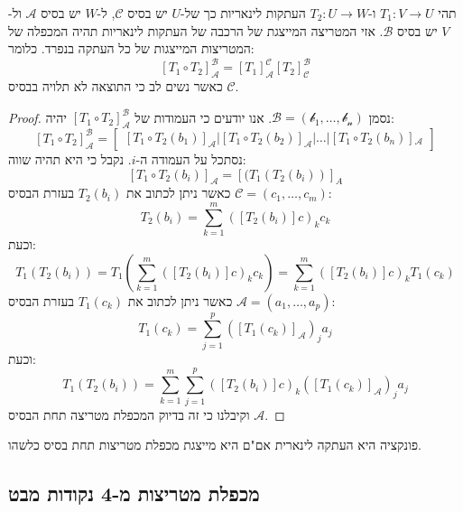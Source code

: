 \documentclass{tstextbook}
\begin{document}
\begin{proposition}
תהי \(T_{1}:V\to U\) ו-\(T_{2}:U\to W\) העתקות לינאריות כך של-\(U\) יש בסיס \(\mathcal{C}\), ל-\(W\) יש בסיס \(\mathcal{A}\) ול-\(V\) יש בסיס \(\mathcal{B}\). אזי המטריצה המייצגת של הרכבה של העתקות לינאריות תהיה המכפלה של המטריצות המייצגות של כל העתקה בנפרד. כלומר:
$$\left[ T_{1}\circ  T_{2} \right]_{\mathcal{A} }^{\mathcal{B} }=[T_{1}]_{\mathcal{A} }^{\mathcal{C} }[T_{2}]_{\mathcal{C} }^{\mathcal{B} }$$
כאשר נשים לב כי התוצאה לא תלויה בבסיס \(\mathcal{C}\).

\end{proposition}
\begin{proof}
נסמן \(\mathcal{B=\left( b_{1},\dots,b_{n} \right)}\).
אנו יודעים כי העמודות של \(\left[ T_{1}\circ T_{2} \right]_{\mathcal{A}}^{\mathcal{B}}\) יהיה:
$$\left[ T_{1}\circ T_{2} \right]_{\mathcal{A} }^{\mathcal{B} }=\begin{bmatrix}\left[ T_{1}\circ  T_{2}(b_{1}) \right]_{\mathcal{A} }\bigg| \left[ T_{1}\circ  T_{2}\left( b_{2} \right) \right]_{\mathcal{A} }\bigg|\dots \bigg| \left[ T_{1}\circ T_{2} (b_{n}) \right]\mathcal{_{A}}  
\end{bmatrix} $$
נסתכל על העמודה ה-\(i\). נקבל כי היא תהיה שווה:
$$\left[ T_{1}\circ T_{2}(b_{i}) \right]_{\mathcal{A} }=[(T_{1}(T_{2}(b_{i}))]_{A}$$
כאשר ניתן לכתוב את \(T_{2}(b_{i})\) בעזרת הבסיס \(\mathcal{C}=\left( c_{1},\dots,c_{m} \right)\):
$$T_{2}(b_{i})=\sum_{k=1}^{m}\left([T_{2}(b_{i})]c\right)_{k}c_{k}$$
וכעת:
$$T_{1}(T_{2}(b_{i}))=T_{1}\left(\sum_{k=1}^{m}\left([T_{2}(b_{i})]c\right)_{k}c_{k}\right)=\sum_{k=1}^{m}\left([T_{2}(b_{i})]c\right)_{k}T_{1}(c_{k})$$
כאשר ניתן לכתוב את \(T_{1}(c_{k})\) בעזרת הבסיס \(\mathcal{A}=\left( a_{1},\dots,a_{p} \right)\):
$$T_{1}(c_{k})=\sum_{j=1}^{p}\left([T_{1}(c_{k})]_{\mathcal{A}}\right)_{j}a_{j}$$
וכעת:
$$T_{1}(T_{2}(b_{i}))=\sum_{k=1}^{m}\sum_{j=1}^{p}\left([T_{2}(b_{i})]c\right)_{k}\left([T_{1}(c_{k})]_{\mathcal{A}}\right)_{j}a_{j}$$
וקיבלנו כי זה בדיוק המכפלת מטריצה תחת הבסיס \(\mathcal{ A}\).

\end{proof}
\begin{theorem}
פונקציה היא העתקה לינארית אם"ם היא מייצגת מכפלת מטריצות תחת בסיס כלשהו. 

\end{theorem}
\subsection{מכפלת מטריצות מ-4 נקודות מבט}
\end{document}
